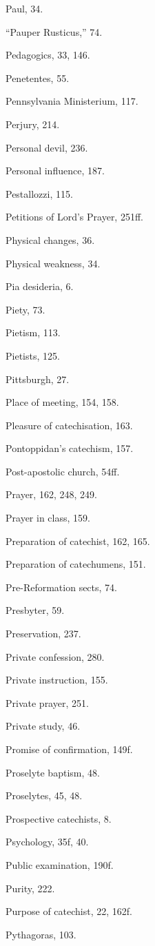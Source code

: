 \begin{originalinhalt}
Paul, 34.

“Pauper Rusticus,” 74.

Pedagogics, 33, 146.

Penetentes, 55.

Pennsylvania Ministerium, 117.

Perjury, 214.

Personal devil, 236.

Personal influence, 187.

Pestallozzi, 115.

Petitions of Lord’s Prayer, 251ff.

Physical changes, 36.

Physical weakness, 34.

Pia desideria, 6.

Piety, 73.

Pietism, 113.

Pietists, 125.

Pittsburgh, 27.

Place of meeting, 154, 158.

Pleasure of catechisation, 163.

Pontoppidan’s catechism, 157.

Post-apostolic church, 54ff.

Prayer, 162, 248, 249.

Prayer in class, 159.

Preparation of catechist, 162, 165.

Preparation of catechumens, 151.

Pre-Reformation sects, 74.

Presbyter, 59.

Preservation, 237.

Private confession, 280.

Private instruction, 155.

Private prayer, 251.

Private study, 46.

Promise of confirmation, 149f.

Proselyte baptism, 48.

Proselytes, 45, 48.

Prospective catechists, 8.

Psychology, 35f, 40.

Public examination, 190f.

Purity, 222.

Purpose of catechist, 22, 162f.

Pythagoras, 103.


\end{originalinhalt}
